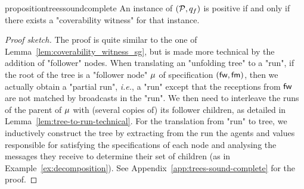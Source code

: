 \begin{restatable}{proposition}{treessoundcomplete}
	\label{prop:trees-sound-complete}
	An instance of \COVER $(\mathcal{P},q_f)$ is positive if and only if there exists a "coverability witness" for that instance.
\end{restatable}
\begin{proof}[Proof sketch]
	The proof is quite similar to the one of Lemma~\ref{lem:coverability_witness_sg}, but is made more technical by the addition of "follower" nodes. 
	When translating an "unfolding tree" to a "run", if the root of the tree is a "follower node" $\mu$ of specification $(\mathsf{fw}, \mathsf{fm})$, then we actually obtain a "partial run", \emph{i.e.}, a "run" except that the receptions from $\mathsf{fw}$ are not matched by broadcasts in the "run". We then need to interleave the runs of the parent of $\mu$ with (several copies of) its follower children, as detailed in Lemma~\ref{lem:tree-to-run-technical}.
	For the translation from "run" to tree, we inductively construct the tree by extracting from the run the agents and values responsible for satisfying the specifications of each node and analysing the messages they receive to determine their set of children (as in Example~\ref{ex:decomposition}). See Appendix~\ref{app:trees-sound-complete} for the proof.
\end{proof}





